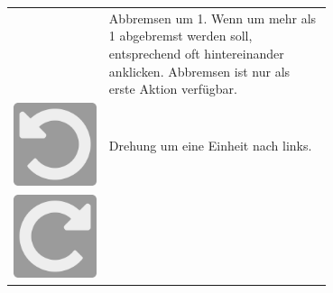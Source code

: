 \documentclass[12pt,a4paper, ngerman, oneside]{scrartcl}
\begin{document}
\begin{table}[h!]
\begin{tabular}{ c m{0.7\linewidth} }
\begin{minipage}{1cm}
    \end{minipage}
    &
    Abbremsen um 1. Wenn um mehr als 1 abgebremst werden soll, entsprechend oft hintereinander anklicken. Abbremsen ist nur als erste Aktion verfügbar.
    \\
    \begin{minipage}{1cm}
      \includegraphics[width=\linewidth]{bilder/rotate-left}
    \end{minipage}
    &
    Drehung um eine Einheit nach links.
    \\
    \begin{minipage}{1cm}
      \includegraphics[width=\linewidth]{bilder/rotate-right}

\end{minipage}
\end{tabular}
\end{table}
\end{document}
